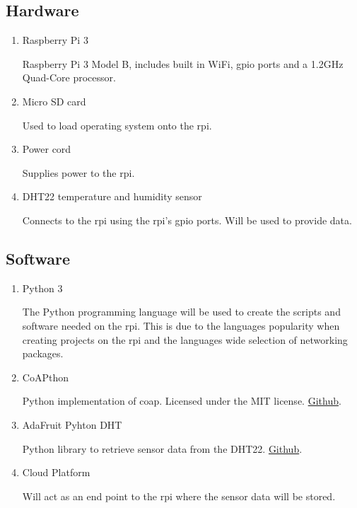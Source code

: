 \subsection{Hardware}
\begin{enumerate}
    \item Raspberry Pi 3

        Raspberry Pi 3 Model B, includes built in WiFi, \gls{gpio} ports and a 1.2GHz Quad-Core processor.
    \item Micro SD card
    
        Used to load operating system onto the \gls{rpi}.
    \item Power cord
    
        Supplies power to the \gls{rpi}.
    \item DHT22 temperature and humidity sensor
    
        Connects to the \gls{rpi} using the \gls{rpi}'s \gls{gpio} ports. Will be used to provide data.

\end{enumerate}

\subsection{Software}
\begin{enumerate}
    \item Python 3

        The Python programming language will be used to create the scripts and software needed on the \gls{rpi}.
        This is due to the languages popularity when creating projects on the \gls{rpi} and the languages wide selection
        of networking packages.
    \item CoAPthon
    
        Python implementation of \gls{coap}. Licensed under the MIT license. \href{https://github.com/Tanganelli/CoAPthon}{Github}.

    \item AdaFruit Pyhton DHT
    
        
        Python library to retrieve sensor data from the DHT22. \href{https://github.com/adafruit/Adafruit_Python_DHT}{Github}.

    \item Cloud Platform
    
        Will act as an end point to the \gls{rpi} where the sensor data will be stored.
\end{enumerate}